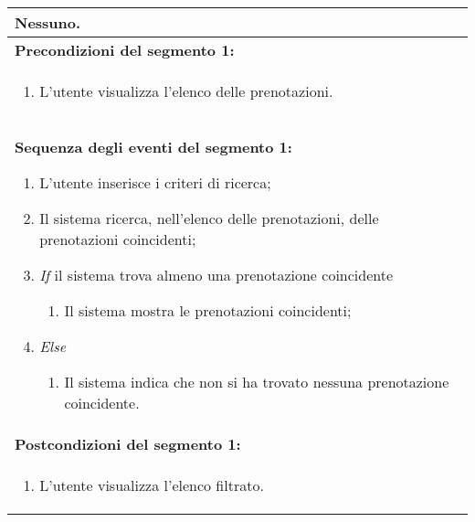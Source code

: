 \documentclass{article}
\begin{document}
\begin{table}[t]
\begin{tabular}{|p{\linewidth}|}
        Nessuno. \\
        \hline
        \cellcolor{gray!20}
        \textbf{Precondizioni del segmento 1:} \\
        \cellcolor{gray!20}
        \begin{minipage}{\linewidth}
            \begin{enumerate}
                \item L'utente visualizza l'elenco delle prenotazioni.
            \end{enumerate}
        \end{minipage} \\
        \hline
        \textbf{Sequenza degli eventi del segmento 1:}
        \begin{enumerate}
            \item L'utente inserisce i criteri di ricerca;
            \item Il sistema ricerca, nell'elenco delle prenotazioni, delle prenotazioni coincidenti;
            \item \textit{If} il sistema trova almeno una prenotazione coincidente
            \begin{enumerate}
                \item Il sistema mostra le prenotazioni coincidenti;
            \end{enumerate}
            \item \textit{Else}
            \begin{enumerate}
                \item Il sistema indica che non si ha trovato nessuna prenotazione coincidente.
            \end{enumerate}
        \end{enumerate} \\
        \hline
        \cellcolor{gray!20}
        \textbf{Postcondizioni del segmento 1:} \\
        \cellcolor{gray!20}
        \begin{minipage}{\linewidth}
            \begin{enumerate}
                \item L'utente visualizza l'elenco filtrato.
            \end{enumerate}
        \end{minipage} \\
        \hline
    \end{tabular}
\end{table}
\end{document}
